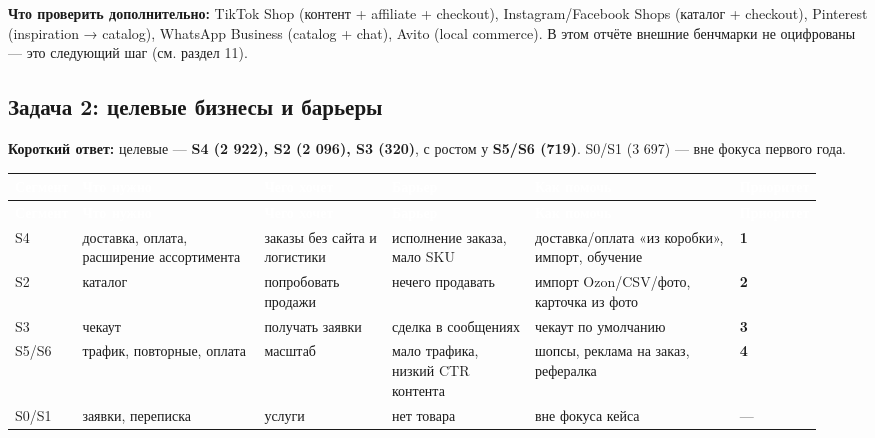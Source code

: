 \documentclass[10pt,a4paper]{article}
\begin{document}
\textbf{Что проверить дополнительно:} TikTok Shop (контент + affiliate + checkout), Instagram/Facebook Shops (каталог + checkout), Pinterest (inspiration → catalog), WhatsApp Business (catalog + chat), Avito (local commerce). В этом отчёте внешние бенчмарки не оцифрованы — это следующий шаг (см. раздел 11).\par

\subsection{Задача 2: целевые бизнесы и барьеры}

\textbf{Короткий ответ:} целевые — \textbf{S4 (2 922), S2 (2 096), S3 (320)}, с ростом у \textbf{S5/S6 (719)}. S0/S1 (3 697) — вне фокуса первого года.\par

\begingroup
\footnotesize
\setlength{\tabcolsep}{3pt}
\renewcommand{\arraystretch}{1.12}
\begin{longtable}{@{}>{\raggedright\arraybackslash}p{0.0401\linewidth}>{\raggedright\arraybackslash}p{0.2346\linewidth}>{\raggedright\arraybackslash}p{0.1602\linewidth}>{\raggedright\arraybackslash}p{0.1888\linewidth}>{\raggedright\arraybackslash}p{0.2632\linewidth}>{\raggedright\arraybackslash}p{0.0515\linewidth}@{}}
\rowcolor{blue}
\textcolor{white}{\textbf{Сегмент}} & \textcolor{white}{\textbf{Что нужно}} & \textcolor{white}{\textbf{Чего хочет}} & \textcolor{white}{\textbf{Барьер}} & \textcolor{white}{\textbf{Как помочь}} & \textcolor{white}{\textbf{Приоритет}} \\
\endfirsthead
\rowcolor{blue}
\textcolor{white}{\textbf{Сегмент}} & \textcolor{white}{\textbf{Что нужно}} & \textcolor{white}{\textbf{Чего хочет}} & \textcolor{white}{\textbf{Барьер}} & \textcolor{white}{\textbf{Как помочь}} & \textcolor{white}{\textbf{Приоритет}} \\
\endhead
\hline
S4 & доставка, оплата, расширение ассортимента & заказы без сайта и логистики & исполнение заказа, мало SKU & доставка/оплата «из коробки», импорт, обучение & \textbf{1} \\
S2 & каталог & попробовать продажи & нечего продавать & импорт Ozon/CSV/фото, карточка из фото & \textbf{2} \\
S3 & чекаут & получать заявки & сделка в сообщениях & чекаут по умолчанию & \textbf{3} \\
S5/S6 & трафик, повторные, оплата & масштаб & мало трафика, низкий CTR контента & шопсы, реклама на заказ, рефералка & \textbf{4} \\
S0/S1 & заявки, переписка & услуги & нет товара & вне фокуса кейса & — \\
\hline
\end{longtable}
\endgroup
\vspace{4pt}
\end{document}

